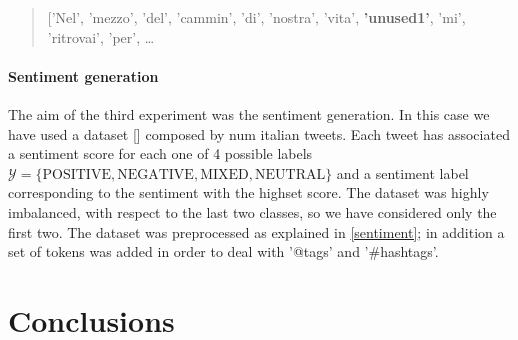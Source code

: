 \documentclass[10pt,twocolumn,letterpaper]{article}
\begin{document}
\begin{quote}
['Nel', 'mezzo', 'del', 'cammin', 'di', 'nostra', 'vita', \textbf{'unused1'},
 'mi',
 'ritrovai',
 'per', \ldots
\end{quote}

\paragraph{Sentiment generation} The aim of the third experiment was the sentiment generation.
In this case we have used a dataset [] composed by num italian tweets.
Each tweet has associated a sentiment score for each one of 4 possible labels
$\mathcal Y = \{\text{POSITIVE}, \text{NEGATIVE}, \text{MIXED}, \text{NEUTRAL}\}$ and a sentiment label corresponding
to the sentiment with the highset score. 
The dataset was highly imbalanced, with respect to the last two classes, so we have considered only the first two.
The dataset was preprocessed as explained in \ref{sentiment}; in addition a set of tokens was added in order to deal
with '@tags' and '#hashtags'.



\section{Conclusions}



\end{document}

